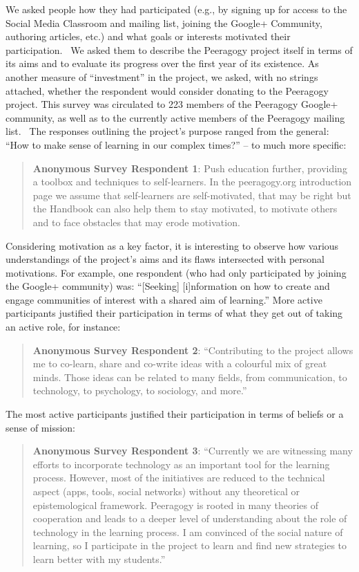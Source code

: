 We asked people how they had participated (e.g., by signing up for
access to the Social Media Classroom and mailing list, joining the
Google+ Community, authoring articles, etc.) and what goals or
interests motivated their participation.~ We asked them to describe
the Peeragogy project itself in terms of its aims and to evaluate its
progress over the first year of its existence. As another measure of
``investment'' in the project, we asked, with no strings attached,
whether the respondent would consider donating to the Peeragogy
project. This survey was circulated to 223 members of the Peeragogy
Google+ community, as well as to the currently active members of the
Peeragogy mailing list.~ The responses outlining the project's purpose
ranged from the general: ``How to make sense of learning in our
complex times?'' -- to much more specific:

\begin{quote}
\textbf{Anonymous Survey Respondent 1}: Push education further,
providing a toolbox and techniques to self-learners. In the
peeragogy.org introduction page we assume that self-learners are
self-motivated, that may be right but the Handbook can also help them
to stay motivated, to motivate others and to face obstacles that may
erode motivation.
\end{quote}

Considering motivation as a key factor, it is interesting to observe how
various understandings of the project's aims and its flaws intersected
with personal motivations. For example, one respondent (who had only
participated by joining the Google+ community) was: ``{[}Seeking{]}
{[}i{]}nformation on how to create and engage communities of interest
with a shared aim of learning.'' More active participants justified
their participation in terms of what they get out of taking an active
role, for instance:

\begin{quote}
\textbf{Anonymous Survey Respondent 2}: ``Contributing to the project
allows me to co-learn, share and co-write ideas with a colourful mix of
great minds. Those ideas can be related to many fields, from
communication, to technology, to psychology, to sociology, and more.''
\end{quote}

The most active participants justified their participation in terms of
beliefs or a sense of mission:

\begin{quote}
\textbf{Anonymous Survey Respondent 3}: ``Currently we are witnessing
many efforts to incorporate technology as an important tool for the
learning process. However, most of the initiatives are reduced to the
technical aspect (apps, tools, social networks) without any theoretical
or epistemological framework. Peeragogy is rooted in many theories of
cooperation and leads to a deeper level of understanding about the role
of technology in the learning process. I am convinced of the social
nature of learning, so I participate in the project to learn and find
new strategies to learn better with my students.''
\end{quote}

